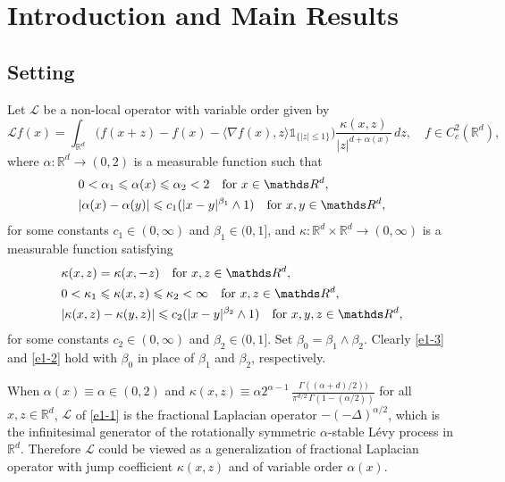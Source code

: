 \documentclass[a4paper,11pt]{amsart}
\renewcommand{\le}{\leqslant}
\newcommand{\R}{\mathds R}
\newcommand{\I}{\mathds 1}
\newcommand{\K}{\kappa}
\newcommand{\A}{\alpha}
\def\LL{{\mathcal L}}
\theoremstyle{definition}
\begin{document}
\section{Introduction and Main Results}
\subsection{Setting}
Let $\LL$  be a non-local operator with variable order given by
\begin{equation}\label{e1-1}
\LL f(x)=\int_{\R^d}\big(f(x+z)-f(x)-\langle\nabla f(x), z\rangle \I_{\{|z|\le 1\}}\big)
\frac{\kappa(x,z)}{|z|^{d+\alpha(x)}}\,dz,\quad   f \in C_c^2(\R^d),
\end{equation}
where $\alpha:\R^d \rightarrow (0,2)$
is a measurable function such that
\begin{equation}\label{e1-3}
\begin{split}
& 0<\alpha_1\le \alpha(x) \le \alpha_2<2  \quad \hbox{for }   x \in \R^d,\\
& |\A(x)-\A(y)|\le c_1(|x-y|^{\beta_1}\wedge 1)   \quad \hbox{for }   x,y\in \R^d,
\end{split}
\end{equation}
for  some constants $c_1\in(0,\infty)$ and $\beta_1\in(0,1]$, and $\kappa:\R^d\times \R^d \rightarrow (0,\infty)$ is a measurable function satisfying
\begin{equation}\label{e1-2}
\begin{split}
& \K(x,z)=\K(x,-z) \quad \hbox{for }  x,z \in \R^d,\\
&  0<\K_1\le \K(x,z)\le \K_2<\infty \quad \hbox{for }   x,z\in \R^d,\\
&  |\K(x,z)-\K(y,z)|\le c_2(|x-y|^{\beta_2}\wedge 1)  \quad \hbox{for }   x,y,z\in \R^d,
\end{split}
\end{equation}
for  some constants $c_2\in(0,\infty)$ and $\beta_2 \in (0,1]$.
Set $\beta_0= \beta_1\wedge \beta_2$. Clearly \eqref{e1-3} and \eqref{e1-2} hold with $\beta_0$ in place of $\beta_1$ and $\beta_2$, respectively.

When
$\A(x)\equiv \A \in (0,2)$ and
$\K(x,z)\equiv \alpha2^{\alpha-1}\, \frac{\Gamma((\alpha+d)/2))}{\pi^{d/2}\,\Gamma(1-(\alpha/2))}$
for all $x,z\in\R^d$,
$\LL $ of \eqref{e1-1} is the fractional Laplacian operator $-(-\Delta)^{\A/2}$, which is the infinitesimal generator of the rotationally symmetric $\A$-stable L\'evy process
in $\R^d$.
Therefore $\LL$ could be viewed as a generalization of fractional Laplacian operator with
jump coefficient $\K(x,z)$ and  of variable order  $\A(x)$.
\end{document}
